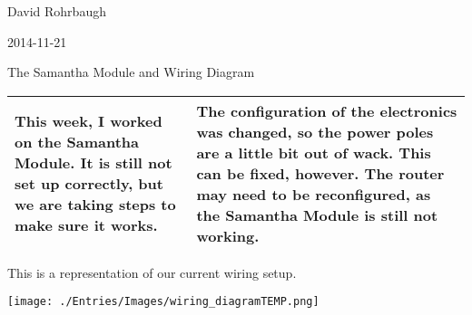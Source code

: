 David Rohrbaugh

2014-11-21

The Samantha Module and Wiring Diagram

\begin{tabular}{|p{5cm}|p{5cm}|}
 \hline
 This week, I worked on the Samantha Module. It is still not set up correctly, but we are taking steps to make sure it works.
 &
 The configuration of the electronics was changed, so the power poles are a little bit out of wack. This can be fixed, however. The router may need to be reconfigured, as the Samantha Module is still not working.
 \\
 \hline
\end{tabular}

\medskip

This is a representation of our current wiring setup.

\begin{center}
 \texttt{[image: ./Entries/Images/wiring\_diagramTEMP.png]} %
\end{center}
